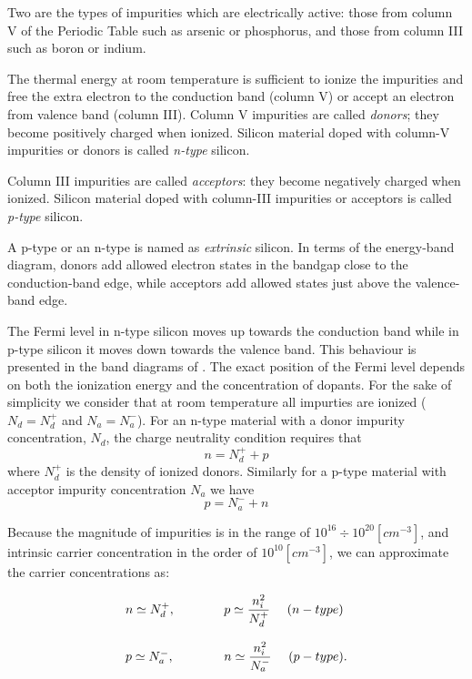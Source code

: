 Two are the types of impurities which are electrically active: those from column V of the Periodic Table such as arsenic or phosphorus, and those from column III such as boron or indium.

The thermal energy at room temperature is sufficient to ionize the impurities and free the extra electron to the conduction band (column V) or accept an electron from valence band (column III). Column V impurities are called \textit{donors}; they become positively charged when ionized. Silicon material doped with column-V impurities or donors is called \textit{n-type} silicon.

Column III impurities are called \textit{acceptors}: they become negatively charged when ionized. Silicon material doped with column-III impurities or acceptors is called \textit{p-type} silicon.

A p-type or an n-type is named as \textit{extrinsic} silicon.
In terms of the energy-band diagram, donors add allowed electron states in the bandgap close to the conduction-band edge, while acceptors add allowed states just above the valence-band edge.

The Fermi level in n-type silicon moves up towards the conduction band while in p-type silicon it moves down towards the valence band. This behaviour is presented in the band diagrams of .
The exact position of the Fermi level depends on both the ionization energy and the concentration of dopants. For the sake of simplicity we consider that at room temperature all impurties are ionized ($N_d = N_d^+$ and $N_a = N_a^-$).  For an n-type material with a donor impurity concentration, $N_d$, the charge neutrality condition requires that
\begin{equation}
\label{eq: equilibrium charge in n-type}
n = N_d^+ + p
\end{equation}
 where $N_d^+$ is the density of ionized donors.  Similarly for a p-type material with acceptor impurity concentration $N_a$ we have
\begin{equation}
\label{eq: equilibrium charge in p-type}
p = N_a^- + n
\end{equation}
 
 Because the magnitude of impurities is in the range of $10^{16}\div 10^{20} [cm^{-3}]$, and intrinsic carrier concentration in the order of $10^{10}[cm^{-3}]$, we can approximate the carrier concentrations as:
  
\begin{equation}
\label{eq: equilibiurm approximation}
\begin{array}{lcl}
n \simeq N_d^+,&\qquad & p \simeq \dfrac{n_i^2}{N_d^+} \psp{8} (n-type)\\ \\
p \simeq N_a^-,& \qquad & n \simeq \dfrac{n_i^2}{N_a^-} \psp{8} (p-type).
\end{array}
\end{equation}


